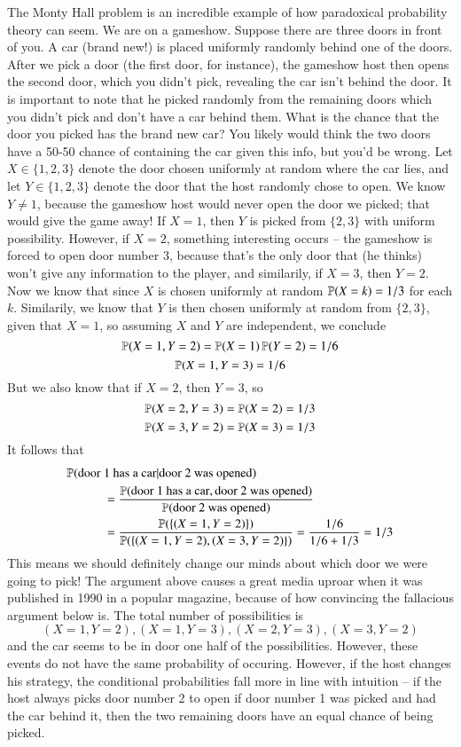 \begin{example}
    The Monty Hall problem is an incredible example of how paradoxical probability theory can seem. We are on a gameshow. Suppose there are three doors in front of you. A car (brand new!) is placed uniformly randomly behind one of the doors. After we pick a door (the first door, for instance), the gameshow host then opens the second door, which you didn't pick, revealing the car isn't behind the door. It is important to note that he picked randomly from the remaining doors which you didn't pick and don't have a car behind them. What is the chance that the door you picked has the brand new car? You likely would think the two doors have a 50-50 chance of containing the car given this info, but you'd be wrong. Let $X \in \{ 1, 2, 3 \}$ denote the door chosen uniformly at random where the car lies, and let $Y \in \{ 1, 2, 3 \}$ denote the door that the host randomly chose to open. We know $Y \neq 1$, because the gameshow host would never open the door we picked; that would give the game away! If $X = 1$, then $Y$ is picked from $\{ 2, 3 \}$ with uniform possibility. However, if $X = 2$, something interesting occurs -- the gameshow is forced to open door number $3$, because that's the only door that (he thinks) won't give any information to the player, and similarily, if $X = 3$, then $Y = 2$. Now we know that since $X$ is chosen uniformly at random $\operatorname{\mathbb{P}}(X = k) = 1/3$ for each $k$. Similarily, we know that $Y$ is then chosen uniformly at random from $\{ 2, 3 \}$, given that $X = 1$, so assuming $X$ and $Y$ are independent, we conclude
    \[ \operatorname{\mathbb{P}}(X = 1, Y = 2) = \operatorname{\mathbb{P}}(X = 1) \operatorname{\mathbb{P}}(Y = 2) = 1/6 \]
    \[ \operatorname{\mathbb{P}}(X = 1, Y = 3) = 1/6 \]
    But we also know that if $X = 2$, then $Y = 3$, so
    \[ \operatorname{\mathbb{P}}(X = 2, Y = 3) = \operatorname{\mathbb{P}}(X = 2) = 1/3 \]
    \[ \operatorname{\mathbb{P}}(X = 3, Y = 2) = \operatorname{\mathbb{P}}(X = 3) = 1/3 \]
    It follows that
    \begin{align*}
        \prob(\text{door}\ &1\ \text{has a car} | \text{door}\ 2\ \text{was opened})\\
        &= \frac{\prob(\text{door}\ 1\ \text{has a car}, \text{door}\ 2\ \text{was opened})}{\prob(\text{door 2 was opened})}\\
        &= \frac{\PP(\{ (X = 1,Y = 2) \})}{\PP( \{ (X = 1,Y = 2), (X = 3,Y = 2) \} )} = \frac{1/6}{1/6 + 1/3} = 1/3
    \end{align*}
    This means we should definitely change our minds about which door we were going to pick! The argument above causes a great media uproar when it was published in 1990 in a popular magazine, because of how convincing the fallacious argument below is. The total number of possibilities is
    \[ (X = 1,Y = 2),(X = 1,Y = 3),(X = 2,Y = 3),(X = 3,Y = 2) \]
    and the car seems to be in door one half of the possibilities. However, these events do not have the same probability of occuring. However, if the host changes his strategy, the conditional probabilities fall more in line with intuition -- if the host always picks door number 2 to open if door number 1 was picked and had the car behind it, then the two remaining doors have an equal chance of being picked.
\end{example}

